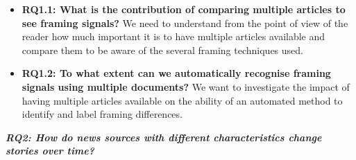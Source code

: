 \begin{itemize}
    
    \item \textbf{RQ1.1: What is the contribution of comparing multiple articles to see framing signals?}
    We need to understand from the point of view of the reader how much important it is to have multiple articles available and compare them to be aware of the several framing techniques used. 
    
    
    \item \textbf{RQ1.2: To what extent can we automatically recognise framing signals using multiple documents?}
    We want to investigate the impact of having multiple articles available on the ability of an automated method to identify and label framing differences.
    
\end{itemize}


\vspace{12px}

\textit{\textbf{RQ2: How do news sources with different characteristics change stories over time?}}

